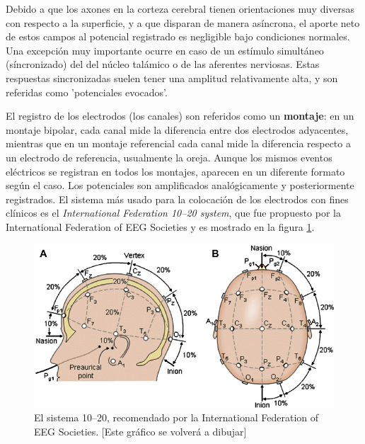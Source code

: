 \documentclass[12pt,a4paper]{mitthesis}
\begin{document}
Debido a que los axones en la corteza cerebral tienen orientaciones muy diversas con respecto a la 
superficie, y a que disparan de manera as\'incrona, el aporte neto de estos campos al potencial 
registrado es negligible bajo condiciones normales.
Una excepci\'on muy importante ocurre en caso de un est\'imulo simult\'aneo (s\'incronizado) del 
del n\'ucleo tal\'amico o de las aferentes nerviosas.
Estas respuestas sincronizadas suelen tener una amplitud relativamente alta, y son referidas como 
'potenciales evocados'.

El registro de los electrodos (los canales) son referidos como un \textbf{montaje}: en un montaje 
bipolar, cada canal mide la diferencia entre dos electrodos adyacentes, mientras que en un montaje 
referencial cada canal mide la diferencia respecto a un electrodo de referencia, usualmente la 
oreja.
Aunque los mismos eventos el\'ectricos se registran en todos los montajes, aparecen en un diferente 
formato seg\'un el caso. 
Los potenciales son amplificados anal\'ogicamente y posteriormente registrados.
El sistema m\'as usado para la colocaci\'on de los electrodos con fines cl\'inicos es el 
\textit{International Federation 10--20 system}, que fue propuesto por la International Federation 
of EEG Societies \cite{Jasper58,AASM07} y es mostrado en la figura \ref{img1020}. 

\begin{figure}
\centering
\includegraphics[width=0.9\linewidth]{Fig.png} 
\caption{El sistema 10--20, recomendado por la
International Federation of EEG Societies. [Este gr\'afico se volver\'a a dibujar]
}
\label{img1020}
\end{figure}
\end{document}

